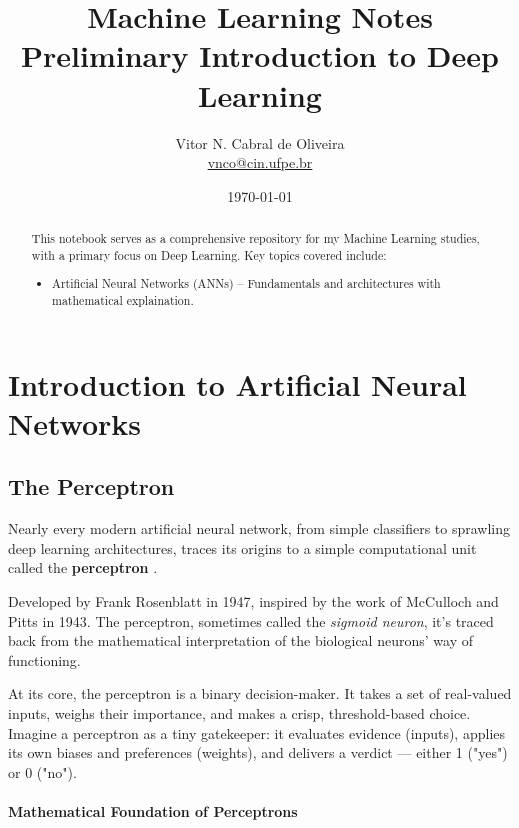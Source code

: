 \documentclass{tufte-handout}
\title{Machine Learning Notes \\ Preliminary Introduction to Deep Learning}
\author{Vitor N. Cabral de Oliveira\\ \href{mailto:vnco@cin.ufpe.br}{vnco@cin.ufpe.br}}
\date{\today}
\begin{document}
\maketitle
\begin{abstract}
    This notebook serves as a comprehensive repository for my Machine Learning studies, with a primary focus on Deep Learning. Key topics covered include:
    \begin{itemize}
        \item Artificial Neural Networks (ANNs) – Fundamentals and architectures with mathematical explaination.
    \end{itemize}
\end{abstract}

\newpage
\hypersetup{linkcolor=wp-text}
\tableofcontents
\hypersetup{linkcolor=wp-primary}
\newpage
\section{Introduction to Artificial Neural Networks}

\subsection{The Perceptron}

Nearly every modern artificial neural network, from simple classifiers to sprawling deep learning architectures, traces its origins to a simple computational unit called the \textbf{perceptron} .

Developed by Frank Rosenblatt in 1947, inspired by the work of McCulloch and Pitts in 1943. The perceptron, sometimes called the \textit{sigmoid neuron}, it's traced back from the mathematical interpretation of the biological neurons' way of functioning.

At its core, the perceptron is a binary decision-maker. It takes a set of real-valued inputs, weighs their importance, and makes a crisp, threshold-based choice. Imagine a perceptron as a tiny gatekeeper: it evaluates evidence (inputs), applies its own biases and preferences (weights), and delivers a verdict --- either 1 ("yes") or 0 ("no").

\paragraph{Mathematical Foundation of Perceptrons}
\end{document}
